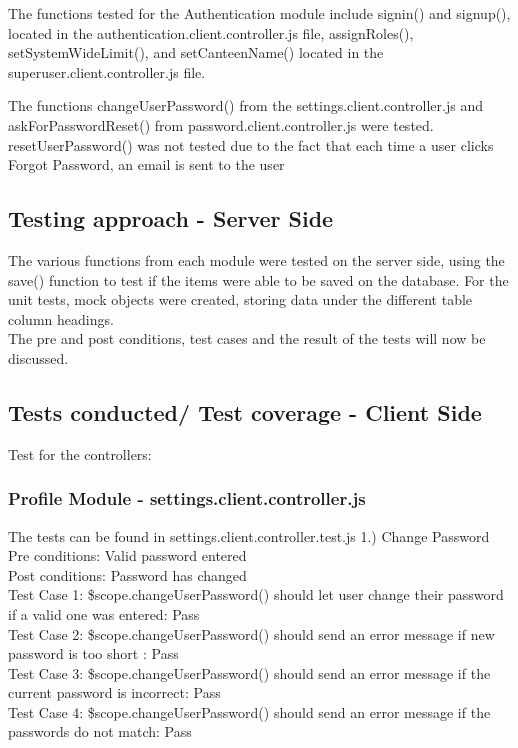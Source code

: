 \documentclass[a4paper,12pt]{report}
\begin{document}
The functions tested for the Authentication module include signin() and signup(), located in the authentication.client.controller.js file, assignRoles(), setSystemWideLimit(), and setCanteenName() located in the  superuser.client.controller.js file.
 
The functions changeUserPassword() from the settings.client.controller.js and askForPasswordReset() from password.client.controller.js were tested. resetUserPassword() was not tested due to the fact that each time a user clicks Forgot Password, an email is sent to the user 
 
\subsection{Testing approach - Server Side}
The various functions from each module were tested on the server side, using the save() function to test if the items were able to be saved on the database. For the unit tests, mock objects were created, storing data under the different table column headings.
\\
The pre and post conditions, test cases and the result of the tests will now be discussed.

\subsection{Tests conducted/ Test coverage - Client Side}
Test for the controllers: 

\subsubsection{Profile Module - settings.client.controller.js}
The tests can be found in settings.client.controller.test.js
1.) Change Password
Pre conditions: Valid password entered
\\Post conditions: Password has changed
\\ Test Case 1: \$scope.changeUserPassword() should let user change their password if a valid one was entered: Pass
\\ Test Case 2: \$scope.changeUserPassword() should send an error message if new password is too short : Pass
\\ Test Case 3: \$scope.changeUserPassword()  should send an error message if the current password is incorrect: Pass
\\ Test Case 4: \$scope.changeUserPassword() should send an error message if the passwords do not match: Pass
 
\end{document}
